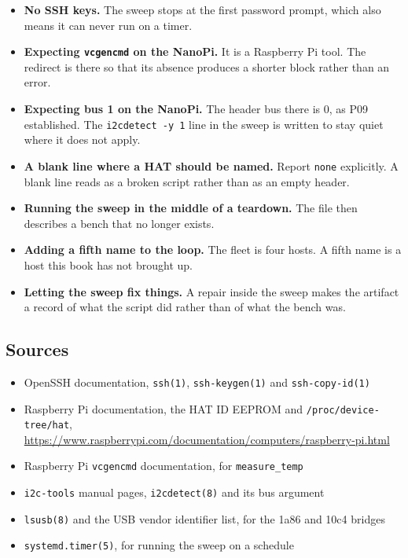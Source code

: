 \begin{itemize}
\item \textbf{No SSH keys.} The sweep stops at the first password prompt, which also means it can never run on a timer.
\item \textbf{Expecting \texttt{vcgencmd} on the NanoPi.} It is a Raspberry Pi tool. The redirect is there so that its absence produces a shorter block rather than an error.
\item \textbf{Expecting bus 1 on the NanoPi.} The header bus there is 0, as P09 established. The \texttt{i2cdetect -y 1} line in the sweep is written to stay quiet where it does not apply.
\item \textbf{A blank line where a HAT should be named.} Report \texttt{none} explicitly. A blank line reads as a broken script rather than as an empty header.
\item \textbf{Running the sweep in the middle of a teardown.} The file then describes a bench that no longer exists.
\item \textbf{Adding a fifth name to the loop.} The fleet is four hosts. A fifth name is a host this book has not brought up.
\item \textbf{Letting the sweep fix things.} A repair inside the sweep makes the artifact a record of what the script did rather than of what the bench was.
\end{itemize}

\subsection*{Sources}

\begin{itemize}
\item OpenSSH documentation, \texttt{ssh(1)}, \texttt{ssh-keygen(1)} and \texttt{ssh-copy-id(1)}
\item Raspberry Pi documentation, the HAT ID EEPROM and \texttt{/proc/device-tree/hat}, \url{https://www.raspberrypi.com/documentation/computers/raspberry-pi.html}
\item Raspberry Pi \texttt{vcgencmd} documentation, for \texttt{measure\_temp}
\item \texttt{i2c-tools} manual pages, \texttt{i2cdetect(8)} and its bus argument
\item \texttt{lsusb(8)} and the USB vendor identifier list, for the 1a86 and 10c4 bridges
\item \texttt{systemd.timer(5)}, for running the sweep on a schedule
\end{itemize}
